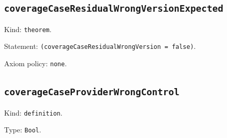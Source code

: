 \documentclass[11pt]{article}
\begin{document}
\subsection*{\texttt{coverageCaseResidualWrongVersionExpected}}
\noindent Kind: \texttt{theorem}.\par
\noindent Statement: \texttt{(coverageCaseResidualWrongVersion = false)}.\par
\noindent Axiom policy: \texttt{none}.\par
\subsection*{\texttt{coverageCaseProviderWrongControl}}
\noindent Kind: \texttt{definition}.\par
\noindent Type: \texttt{Bool}.\par
\end{document}
